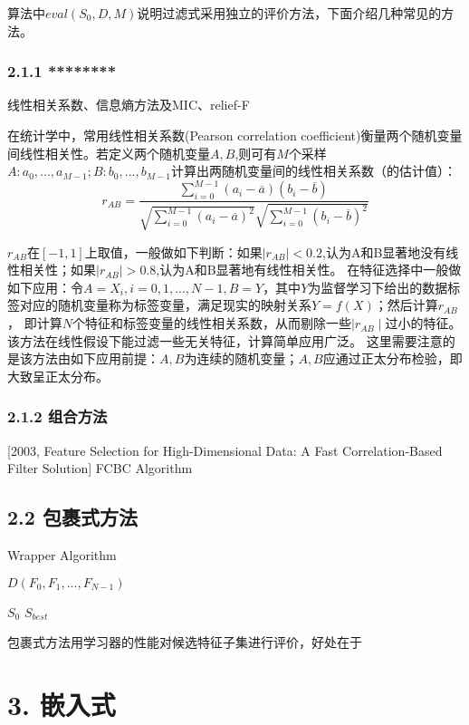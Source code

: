 \documentclass[a4paper,UTF8]{article}
\begin{document}
  算法中$ eval(S_{0}, D, M)$说明过滤式采用独立的评价方法，下面介绍几种常见的方法。

\subsubsection*{2.1.1 ********}
  线性相关系数、信息熵方法及MIC、relief-F

  在统计学中，常用线性相关系数(Pearson correlation coefficient)衡量两个随机变量间线性相关性。若定义两个随机变量$ A, B $,则可有$M$个采样
  $ A: a_{0},...,a_{M-1}; B: b_{0},...,b_{M-1}$计算出两随机变量间的线性相关系数（的估计值）：
  $$  r_{AB} = \frac{\sum_{i=0}^{M-1}(a_{i}-\overline{a})(b_{i}-\overline{b})}{\sqrt{\sum_{i=0}^{M-1}(a_{i}-\overline{a})^2}\sqrt{\sum_{i=0}^{M-1}(b_{i}-\overline{b})^2}}$$

  $ r_{AB} $在$ [-1,1]$上取值，一般做如下判断：如果$ \mid{r_{AB}}\mid<0.2$,认为A和B显著地没有线性相关性；如果$ \mid{r_{AB}}\mid>0.8$,认为A和B显著地有线性相关性。
  在特征选择中一般做如下应用：令$ A=X_{i},i=0,1,...,N-1, B=Y$，其中$Y$为监督学习下给出的数据标签对应的随机变量称为标签变量，满足现实的映射关系$Y=f(X)$；然后计算$ r_{AB} $，
  即计算$N$个特征和标签变量的线性相关系数，从而剔除一些$\mid{r_{AB}}\mid$过小的特征。该方法在线性假设下能过滤一些无关特征，计算简单应用广泛。
  这里需要注意的是该方法由如下应用前提：$A,B$为连续的随机变量；$A,B$应通过正太分布检验，即大致呈正太分布。



\subsubsection*{2.1.2 组合方法}

[2003, Feature Selection for High-Dimensional Data: A Fast Correlation-Based Filter Solution] FCBC Algorithm



\subsection*{2.2 包裹式方法}

\begin{algorithm}
  \caption{Wrapper Algorithm}
  \begin{algorithmic}
    \REQUIRE $ D(F_{0}, F_{1},..., F_{N-1})$

             $ S_{0}$
    \ENSURE $ S_{best} $

  \end{algorithmic}




\end{algorithm}

包裹式方法用学习器的性能对候选特征子集进行评价，好处在于



\section*{3. 嵌入式}
\end{document}
